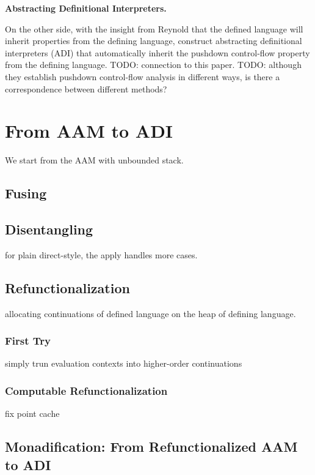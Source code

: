 \documentclass[acmsmall,review,anonymous]{acmart}\settopmatter{printfolios=true,printccs=false,printacmref=false}
\begin{document}
\textbf{Abstracting Definitional Interpreters.}

On the other side, with the insight from Reynold that the defined language will inherit properties
from the defining language, \citeauthor{darais2017abstracting} construct abstracting 
definitional interpreters (ADI) that automatically inherit the pushdown control-flow 
property from the defining language.
TODO: connection to this paper.
TODO: although they establish pushdown control-flow analysis in different ways, 
is there a correspondence between different methods?


\section{From AAM to ADI}

We start from the AAM with unbounded stack.

\subsection{Fusing}

\subsection{Disentangling}

for plain direct-style, the apply handles more cases.

\subsection{Refunctionalization}

allocating continuations of defined language on the heap of defining language.

\subsubsection{First Try}

simply trun evaluation contexts into higher-order continuations

\subsubsection{Computable Refunctionalization}

fix point cache

\subsection{Monadification: From Refunctionalized AAM to ADI}
\end{document}
